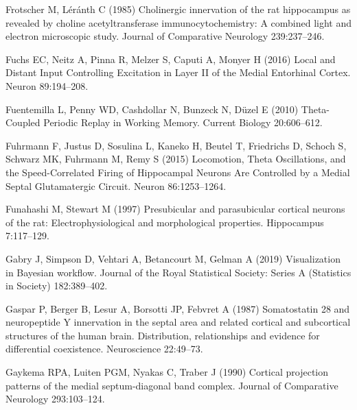 \documentclass[
  12pt,
  a4paper,
  openany]{book}
\newlength{\cslhangindent}
\newlength{\cslentryspacingunit} %
\newenvironment{CSLReferences}[2] %
 {%
  \setlength{\parindent}{0pt}
  \ifodd #1
  \let\oldpar\par
  \def\par{\hangindent=\cslhangindent\oldpar}
  \fi
  \setlength{\parskip}{#2\cslentryspacingunit}
 }%
 {}
\begin{document}
\begin{CSLReferences}{1}{0}
\leavevmode{}%
Frotscher M, Léránth C (1985) Cholinergic innervation of the rat hippocampus as revealed by choline acetyltransferase immunocytochemistry: {A} combined light and electron microscopic study. Journal of Comparative Neurology 239:237--246.

\leavevmode{}%
Fuchs EC, Neitz A, Pinna R, Melzer S, Caputi A, Monyer H (2016) Local and {Distant} {Input} {Controlling} {Excitation} in {Layer} {II} of the {Medial} {Entorhinal} {Cortex}. Neuron 89:194--208.

\leavevmode{}%
Fuentemilla L, Penny WD, Cashdollar N, Bunzeck N, Düzel E (2010) Theta-{Coupled} {Periodic} {Replay} in {Working} {Memory}. Current Biology 20:606--612.

\leavevmode{}%
Fuhrmann F, Justus D, Sosulina L, Kaneko H, Beutel T, Friedrichs D, Schoch S, Schwarz MK, Fuhrmann M, Remy S (2015) Locomotion, {Theta} {Oscillations}, and the {Speed}-{Correlated} {Firing} of {Hippocampal} {Neurons} {Are} {Controlled} by a {Medial} {Septal} {Glutamatergic} {Circuit}. Neuron 86:1253--1264.

\leavevmode{}%
Funahashi M, Stewart M (1997) Presubicular and parasubicular cortical neurons of the rat: {Electrophysiological} and morphological properties. Hippocampus 7:117--129.

\leavevmode{}%
Gabry J, Simpson D, Vehtari A, Betancourt M, Gelman A (2019) Visualization in {Bayesian} workflow. Journal of the Royal Statistical Society: Series A (Statistics in Society) 182:389--402.

\leavevmode{}%
Gaspar P, Berger B, Lesur A, Borsotti JP, Febvret A (1987) Somatostatin 28 and neuropeptide {Y} innervation in the septal area and related cortical and subcortical structures of the human brain. {Distribution}, relationships and evidence for differential coexistence. Neuroscience 22:49--73.

\leavevmode{}%
Gaykema RPA, Luiten PGM, Nyakas C, Traber J (1990) Cortical projection patterns of the medial septum-diagonal band complex. Journal of Comparative Neurology 293:103--124.


\end{CSLReferences}
\end{document}
